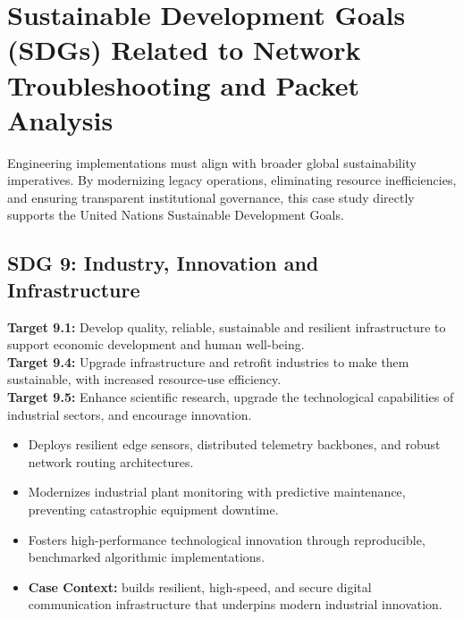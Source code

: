 \section{Sustainable Development Goals (SDGs) Related to Network Troubleshooting and Packet Analysis}
Engineering implementations must align with broader global sustainability imperatives. By modernizing legacy operations, eliminating resource inefficiencies, and ensuring transparent institutional governance, this case study directly supports the United Nations Sustainable Development Goals.

\subsection{SDG 9: Industry, Innovation and Infrastructure}
\noindent\textbf{Target 9.1:} Develop quality, reliable, sustainable and resilient infrastructure to support economic development and human well-being. \\
\noindent\textbf{Target 9.4:} Upgrade infrastructure and retrofit industries to make them sustainable, with increased resource-use efficiency. \\
\noindent\textbf{Target 9.5:} Enhance scientific research, upgrade the technological capabilities of industrial sectors, and encourage innovation.
\begin{itemize}
  \item Deploys resilient edge sensors, distributed telemetry backbones, and robust network routing architectures.
  \item Modernizes industrial plant monitoring with predictive maintenance, preventing catastrophic equipment downtime.
  \item Fosters high-performance technological innovation through reproducible, benchmarked algorithmic implementations.
  \item \textbf{Case Context:} builds resilient, high-speed, and secure digital communication infrastructure that underpins modern industrial innovation.
\end{itemize}
